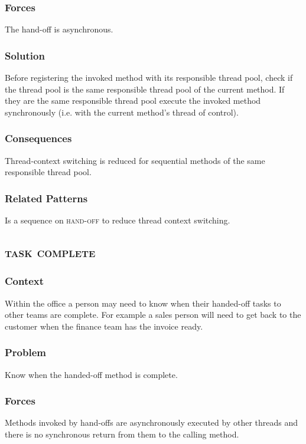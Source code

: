 \documentclass[prodmode]{style/acmlarge}
\begin{document}
\subsubsection*{Forces} The hand-off is asynchronous.

\subsubsection*{Solution} Before registering the invoked method with its
responsible thread pool, check if the thread pool is the same responsible thread
pool of the current method.  If they are the same responsible thread pool
execute the invoked method synchronously (i.e. with the current method's thread
of control).

\subsubsection*{Consequences} Thread-context switching is reduced for sequential
methods of the same responsible thread pool.

\subsubsection*{Related Patterns} Is a sequence on \textsc{hand-off} to reduce
thread context switching.



\subsection{\textsc{\textbf{task complete}}}

\subsubsection*{Context} Within the office a person may need to know when their
handed-off tasks to other teams are complete.  For example a sales person will
need to get back to the customer when the finance team has the invoice ready.

\subsubsection*{Problem} Know when the handed-off method is complete.

\subsubsection*{Forces} Methods invoked by hand-offs are asynchronously executed by other
threads and there is no synchronous return from them to the calling method.
\end{document}
